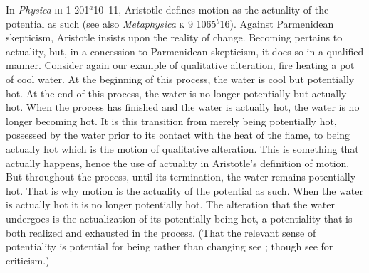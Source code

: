 In \emph{Physica} \textsc{iii} 1 201\( ^{a} \)10--11, Aristotle defines motion as the actuality of the potential as such (see also \emph{Metaphysica} \textsc{k} 9 1065\( ^{b} \)16). Against Parmenidean skepticism, Aristotle insists upon the reality of change. Becoming pertains to actuality, but, in a concession to Parmenidean skepticism, it does so in a qualified manner. Consider again our example of qualitative alteration, fire heating a pot of cool water. At the beginning of this process, the water is cool but potentially hot. At the end of this process, the water is no longer potentially but actually hot. When the process has finished and the water is actually hot, the water is no longer becoming hot. It is this transition from merely being potentially hot, possessed by the water prior to its contact with the heat of the flame, to being actually hot which is the motion of qualitative alteration. This is something that actually happens, hence the use of actuality in Aristotle's definition of motion. But throughout the process, until its termination, the water remains potentially hot. That is why motion is the actuality of the potential as such. When the water is actually hot it is no longer potentially hot. The alteration that the water undergoes is the actualization of its potentially being hot, a potentiality that is both realized and exhausted in the process. (That the relevant sense of potentiality is potential for being rather than changing see \citealt{Kosman:1969aa}; though see \citealt{Heinaman:1994aa} for criticism.)

